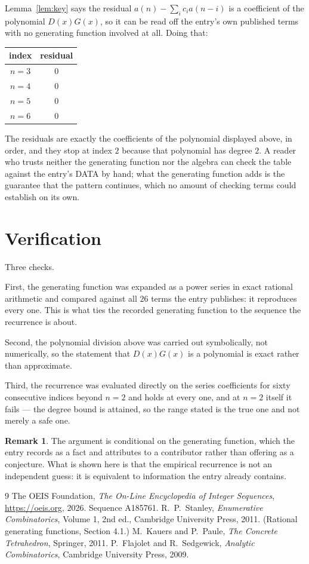 \documentclass[11pt,a4paper]{article}
\theoremstyle{plain}
\theoremstyle{definition}
\newtheorem{remark}[theorem]{Remark}
\begin{document}
Lemma~\ref{lem:key} says the residual $a(n)-\sum_ic_ia(n-i)$ is a coefficient of the
polynomial $D(x)G(x)$, so it can be read off the entry's own published terms with no
generating function involved at all. Doing that:
\begin{center}
\begin{tabular}{cc}
index & residual \\ \hline
$n=3$ & $0$ \\
$n=4$ & $0$ \\
$n=5$ & $0$ \\
$n=6$ & $0$
\end{tabular}
\end{center}
The residuals are exactly the coefficients of the polynomial displayed above, in order, and
they stop at index $2$ because that polynomial has degree $2$. A reader who trusts
neither the generating function nor the algebra can check the table against the entry's DATA
by hand; what the generating function adds is the guarantee that the pattern continues, which
no amount of checking terms could establish on its own.

\section{Verification}

Three checks.

First, the generating function was expanded as a power series in exact rational arithmetic and
compared against all $26$ terms the entry publishes: it reproduces every one. This is
what ties the recorded generating function to the sequence the recurrence is about.

Second, the polynomial division above was carried out symbolically, not numerically, so the
statement that $D(x)G(x)$ is a polynomial is exact rather than approximate.

Third, the recurrence was evaluated directly on the series coefficients for sixty consecutive
indices beyond $n=2$ and holds at every one, and at $n=2$ itself it fails --- the
degree bound is attained, so the range stated is the true one and not merely a safe one.

\begin{remark}
The argument is conditional on the generating function, which the entry records as a fact and
attributes to a contributor rather than offering as a conjecture. What is shown here is that
the empirical recurrence is not an independent guess: it is equivalent to information the
entry already contains.
\end{remark}

\begin{thebibliography}{9}
 The OEIS Foundation, \emph{The On-Line Encyclopedia of Integer
Sequences}, \url{https://oeis.org}, 2026. Sequence A185761.
 R.~P.~Stanley, \emph{Enumerative Combinatorics}, Volume 1, 2nd ed.,
Cambridge University Press, 2011. (Rational generating functions, Section 4.1.)
 M.~Kauers and P.~Paule, \emph{The Concrete Tetrahedron}, Springer, 2011.
 P.~Flajolet and R.~Sedgewick, \emph{Analytic Combinatorics}, Cambridge
University Press, 2009.
\end{thebibliography}
\end{document}
